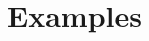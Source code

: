 \documentclass{beamer}
\newcommand{\Cp}{\mathrm{C}_{\mathrm{p}}}
\begin{document}
    


    
        

\section{Examples}
\end{document}
